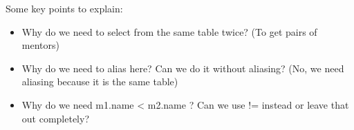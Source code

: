 
\begin{guide}
\begin{blocksection}
Some key points to explain:
\begin{itemize}
	\item Why do we need to select from the same table twice? (To get pairs of mentors)
	\item Why do we need to alias here? Can we do it without aliasing? (No, we need aliasing because it is the same table)
	\item Why do we need m1.name < m2.name ? Can we use != instead or leave that out completely?
\end{itemize}
\end{blocksection}
\end{guide}
